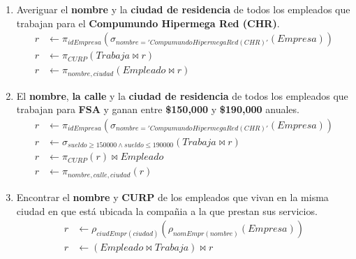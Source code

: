 \documentclass{article}
\begin{document}
\begin{enumerate}
{{\begin{enumerate}
{\begin{align*}
                        \end{align*}
                    }
                    \item {
                        Averiguar el \textbf{nombre} y la \textbf{ciudad de
                        residencia} de todos los empleados que trabajan para el 
                        \textbf{Compumundo Hipermega Red (CHR)}.
                        \begin{align*}
                            r &\leftarrow \pi_{idEmpresa}(\sigma_{nombre = 
                            'Compumundo Hipermega Red (CHR)'}(Empresa)) \\
                            r &\leftarrow \pi_{CURP}(Trabaja \bowtie r) \\
                            r &\leftarrow \pi_{nombre, ciudad}(Empleado \bowtie r)
                        \end{align*}
                    }
                    \item {
                        El \textbf{nombre}, \textbf{la calle} y la \textbf{ciudad
                        de residencia} de todos los empleados que trabajan para
                        \textbf{FSA} y ganan entre \textbf{\$150,000} y
                        \textbf{\$190,000} anuales.
                        \begin{align*}
                            r &\leftarrow \pi_{idEmpresa}(\sigma_{nombre = 
                            'Compumundo Hipermega Red (CHR)'}(Empresa)) \\
                            r &\leftarrow \sigma_{sueldo\geq 150000\land sueldo\leq 190000}
                            (Trabaja \bowtie r) \\
                            r &\leftarrow \pi_{CURP}(r) \bowtie Empleado\\
                            r &\leftarrow \pi_{nombre, calle, ciudad}(r)
                        \end{align*}
                    }
                    \item {
                        Encontrar el \textbf{nombre} y \textbf{CURP} de los
                        empleados que vivan en la misma ciudad en que está
                        ubicada la compañia a la que prestan sus servicios.
                        \begin{align*}
                            r &\leftarrow \rho_{ciudEmpr(ciudad)}(\rho_{nomEmpr(nombre)}
                            (Empresa))\\
                            r &\leftarrow (Empleado\bowtie Trabaja) \bowtie r\\

\end{align*}}
\end{enumerate}}}
\end{enumerate}
\end{document}
